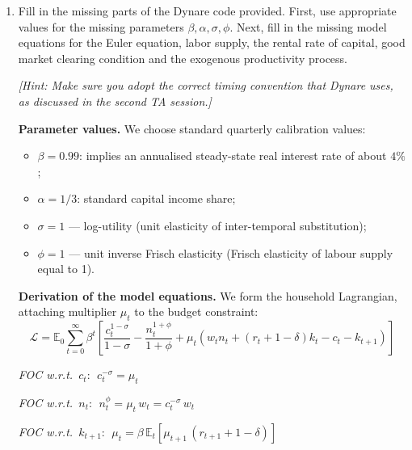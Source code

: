 \documentclass[dvipsnames,11pt]{article}
\begin{document}
        \begin{enumerate}
    
            \item[1.] Fill in the missing parts of the Dynare code provided. First,  use appropriate values for the missing parameters $\beta, \alpha, \sigma, \phi$. Next, fill in the missing model equations for the Euler equation, labor supply, the rental rate of capital, good market clearing condition and the exogenous productivity process.  

                \textit{[Hint: Make sure you adopt the correct timing convention that Dynare uses, as discussed in the second TA session.]}

                \begin{solution}

                    \textbf{Parameter values.} We choose standard quarterly calibration values:
                    \begin{itemize}
                        \item $\beta = 0.99$: implies an annualised steady-state real interest rate of about $4\%$;
                        \item $\alpha = 1/3$: standard capital income share;
                        \item $\sigma = 1$ — log-utility (unit elasticity of inter-temporal substitution);
                        \item $\phi = 1$ — unit inverse Frisch elasticity (Frisch elasticity of labour supply equal to 1).
                    \end{itemize}
                    
                    \textbf{Derivation of the model equations.} We form the household Lagrangian, attaching multiplier $\mu_t$ to the budget constraint:
                    \[
                    \mathcal{L} = \mathbb{E}_0 \sum_{t=0}^{\infty} \beta^t \left[ \frac{c_t^{1-\sigma}}{1-\sigma} - \frac{n_t^{1+\phi}}{1+\phi} + \mu_t \left( w_t n_t + (r_t + 1-\delta) k_t - c_t - k_{t+1} \right) \right]
                    \]
                    
                    \textit{FOC w.r.t.\ $c_t$}: $\;c_t^{-\sigma} = \mu_t$
                    
                    \textit{FOC w.r.t.\ $n_t$}: $\;n_t^{\phi} = \mu_t\, w_t = c_t^{-\sigma}\, w_t$
                    
                    \textit{FOC w.r.t.\ $k_{t+1}$}: $\;\mu_t = \beta\,\mathbb{E}_t\!\left[\mu_{t+1}\,(r_{t+1}+1-\delta)\right]$
                    

\end{solution}
\end{enumerate}
\end{document}
